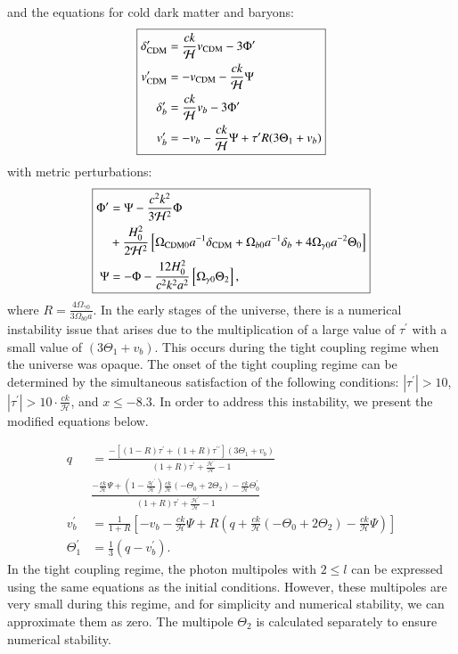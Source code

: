 \documentclass{aa}
\begin{document}
and the equations for cold dark matter and baryons:
$$
\boxed{
\begin{aligned}
\delta_{\rm CDM}^\prime &= \frac{ck}{\mathcal{H}} v_{\rm CDM} - 3\Phi^\prime \\
v_{\rm CDM}^\prime &= -v_{\rm CDM} -\frac{ck}{\mathcal{H}} \Psi \\
\delta_b^\prime &= \frac{ck}{\mathcal{H}}v_b -3\Phi^\prime \\
v_b^\prime &= -v_b - \frac{ck}{\mathcal{H}}\Psi + \tau^\prime R(3\Theta_1 + v_b) \\
\end{aligned}
}
$$
with metric perturbations:
$$
\boxed{
\begin{aligned}
\Phi^\prime &= \Psi - \frac{c^2k^2}{3\mathcal{H}^2} \Phi\\
&+ \frac{H_0^2}{2\mathcal{H}^2}
\left[\Omega_{\rm CDM 0} a^{-1} \delta_{\rm CDM} + \Omega_{b 0} a^{-1} \delta_b + 4\Omega_{\gamma 0}
a^{-2}\Theta_0\right] \\
\Psi &= -\Phi - \frac{12H_0^2}{c^2k^2a^2}\left[\Omega_{\gamma 0}\Theta_2\right], \\
\end{aligned}
}
$$
where $R = \frac{4\Omega_{\gamma 0}}{3\Omega_{b 0} a}$. In the early stages of the universe, there is a numerical instability issue that arises due to the multiplication of a large value of $\tau^\prime$ with a small value of $(3\Theta_1+v_b)$. This occurs during the tight coupling regime when the universe was opaque. The onset of the tight coupling regime can be determined by the simultaneous satisfaction of the following conditions: $|\tau^\prime| > 10$, $|\tau^\prime| > 10 \cdot \frac{ck}{\mathcal{H}}$, and $x \leq -8.3$. In order to address this instability, we present the modified equations below.

$$
\boxed{
\begin{aligned}
q &= \frac{-[(1-R)\tau^\prime + (1+R)\tau^{\prime\prime}](3\Theta_1+v_b)}{(1+R)\tau^\prime + \frac{\mathcal{H}^\prime}{\mathcal{H}} -1}\\
  &\frac{-\frac{ck}{\mathcal{H}}\Psi + (1-\frac{\mathcal{H}^\prime}{\mathcal{H}})\frac{ck}{\mathcal{H}}(-\Theta_0 +
2\Theta_2) - \frac{ck}{\mathcal{H}}\Theta_0^\prime}{(1+R)\tau^\prime + \frac{\mathcal{H}^\prime}{\mathcal{H}} -1}\\
v_b^\prime &= \frac{1}{1+R} \left[-v_b - \frac{ck}{\mathcal{H}}\Psi + R(q +
\frac{ck}{\mathcal{H}}(-\Theta_0 + 2\Theta_2) - \frac{ck}{\mathcal{H}}\Psi)\right]\\
\Theta^\prime_1 &= \frac{1}{3} (q - v_b^\prime).
\end{aligned}
}
$$
In the tight coupling regime, the photon multipoles with $2 \leq l$ can be expressed using the same equations as the initial conditions. However, these multipoles are very small during this regime, and for simplicity and numerical stability, we can approximate them as zero. The multipole $\Theta_2$ is calculated separately to ensure numerical stability.\\
\end{document}
